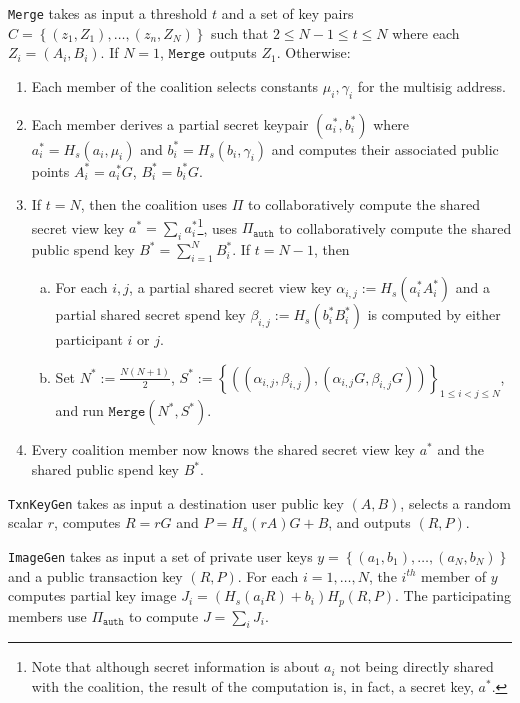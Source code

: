 \documentclass{mrl}
\theoremstyle{definition}
\begin{document}
\texttt{Merge} takes as input a threshold $t$ and a set of key pairs $C=\left\{(z_1,Z_1), \ldots, (z_n,Z_N)\right\}$  such that $2 \leq N-1 \leq t \leq N$ where each $Z_i = (A_i,B_i)$. If $N=1$, $\texttt{Merge}$ outputs $Z_1$.  Otherwise:
\begin{enumerate}[(1)]
\item Each member of the coalition selects constants $\mu_i, \gamma_i$ for the multisig address. 
\item Each member derives a partial secret keypair $(a^*_i, b^*_i)$ where $a^*_i = H_s(a_i, \mu_i)$ and $b^*_i = H_s(b_i, \gamma_i)$ and computes their associated public points $A^*_i=a^*_i G$, $B^*_i = b^*_i G$. 
\item If $t=N$, then the coalition uses $\Pi$ to collaboratively compute the shared secret view key $a^* = \sum_i a^*_i$\footnote{Note that although secret information is about $a_i$ not being directly shared with the coalition, the result of the computation is, in fact, a secret key, $a^*$.}, uses $\Pi_{\texttt{auth}}$ to collaboratively compute the shared public spend key $B^* = \sum_{i=1}^{N} B^*_i$. If $t=N-1$, then %
\begin{enumerate}[(a)]
\item For each $i,j$, a partial shared secret view key $\alpha_{i,j} := H_s(a^*_iA^*_i)$ and a partial shared secret spend key $\beta_{i,j} := H_s(b^*_iB^*_i)$ is computed by either participant $i$ or $j$.
\item Set $N^* := \frac{N(N+1)}{2}$, $S^* := \left\{((\alpha_{i,j},\beta_{i,j}), (\alpha_{i,j}G, \beta_{i,j}G))\right\}_{1 \leq i < j \leq N}$, and run $\texttt{Merge}(N^*, S^*)$.
\end{enumerate}
\item Every coalition member now knows the shared secret view key $a^*$ and the shared public spend key $B^*$.

\end{enumerate}

\texttt{TxnKeyGen} takes as input a destination user public key $(A,B)$, selects a random scalar $r$, computes $R=rG$ and $P = H_s(rA)G + B$, and outputs $(R,P)$.

\texttt{ImageGen} takes as input a set of private user keys $y = \left\{(a_1, b_1), \ldots, (a_N, b_N)\right\}$ and a public transaction key $(R,P)$. For each $i=1,\ldots,N$, the $i^{th}$ member of $y$ computes partial key image $J_i = (H_s(a_i R)+ b_i)H_p(R,P)$. The participating members use $\Pi_\texttt{auth}$ to compute $J = \sum_i J_i$.
\end{document}
